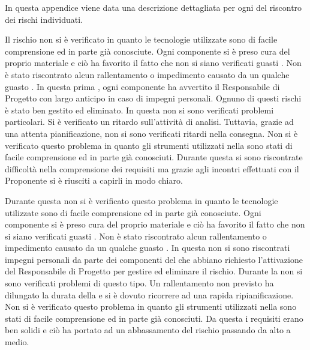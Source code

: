 	In questa appendice viene data una descrizione dettagliata per ogni  del riscontro dei rischi individuati.


		Il rischio non si è verificato in quanto le tecnologie utilizzate sono di facile comprensione ed in parte già conosciute.
		Ogni componente si è preso cura del proprio materiale e ciò ha favorito il fatto che non si siano verificati guasti . Non è stato riscontrato alcun rallentamento o impedimento causato da un qualche guasto .
		In questa prima , ogni componente ha avvertito il Responsabile di Progetto con largo anticipo in caso di impegni personali. Ognuno di questi rischi è stato ben gestito ed eliminato.
		In questa  non si sono verificati problemi particolari.
		Si è verificato un ritardo sull’attività di analisi. Tuttavia, grazie ad una attenta pianificazione, non si sono verificati ritardi nella consegna.
		Non si è verificato questo problema in quanto gli strumenti utilizzati nella  sono stati di facile comprensione ed in parte già conosciuti.
		Durante questa  si sono riscontrate difficoltà nella comprensione dei requisiti ma grazie agli incontri effettuati con il Proponente si è riusciti a capirli in modo chiaro.
		
	
		Durante questa  non si è verificato questo problema in quanto le tecnologie utilizzate sono di facile comprensione ed in parte già conosciute. 
		Ogni componente si è preso cura del proprio materiale e ciò ha favorito il fatto che non si siano verificati guasti . Non è stato riscontrato alcun rallentamento o impedimento causato da un qualche guasto .
		In questa  non si sono riscontrati impegni personali da parte dei componenti del  che abbiano richiesto l'attivazione del Responsabile di Progetto per gestire ed eliminare il rischio.
		Durante la  non si sono verificati problemi di questo tipo.
		Un rallentamento non previsto ha dilungato la durata della  e si è dovuto ricorrere ad una rapida ripianificazione.
		Non si è verificato questo problema in quanto gli strumenti utilizzati nella  sono stati di facile comprensione ed in parte già conosciuti.
		Da questa  i requisiti erano ben solidi e ciò ha portato ad un abbassamento del rischio passando da alto a medio. 



